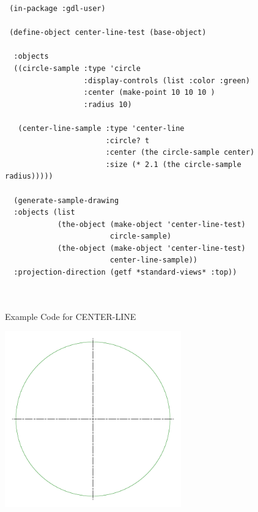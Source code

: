 \documentclass [11pt]{book}
\begin{document}
\begin{itemize}
\begin{description}
\end{description}




\begin{figure}
\begin{lrbox}{\boxedverb}
\begin{minipage}{\linewidth}
{\small

\begin{verbatim}
 (in-package :gdl-user)

 (define-object center-line-test (base-object)
 
  :objects 
  ((circle-sample :type 'circle
                  :display-controls (list :color :green)
                  :center (make-point 10 10 10 )
                  :radius 10)
   
   (center-line-sample :type 'center-line
                       :circle? t
                       :center (the circle-sample center)
                       :size (* 2.1 (the circle-sample radius)))))

  (generate-sample-drawing 
  :objects (list 
            (the-object (make-object 'center-line-test) 
                        circle-sample) 
            (the-object (make-object 'center-line-test) 
                        center-line-sample))
  :projection-direction (getf *standard-views* :top))
 
 
\end{verbatim}}
\end{minipage}
\end{lrbox}
\fbox{\usebox{\boxedverb}}

\caption{Example Code for CENTER-LINE}

\label{fig:example-code-CENTER-LINE}

\end{figure}

\begin{figure}
\begin{center}
\includegraphics[width=3in,height=3in]{../images/example-CENTER-LINE.pdf}
\end{center}


\end{figure}
\end{itemize}
\end{document}

